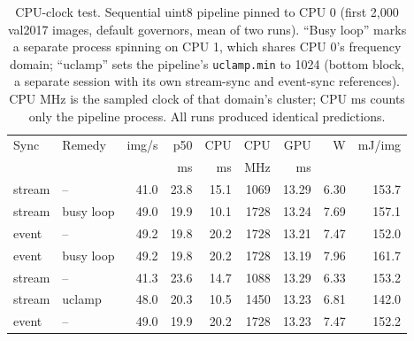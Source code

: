 \begin{table}[t]
\centering
\caption{CPU-clock test. Sequential uint8 pipeline pinned to CPU 0 (first 2,000 val2017
images, default governors, mean of two runs). ``Busy loop'' marks a separate process
spinning on CPU 1, which shares CPU 0's frequency domain; ``uclamp'' sets the pipeline's
\texttt{uclamp.min} to 1024 (bottom block, a separate session with its own stream-sync
and event-sync references). CPU MHz is the sampled clock of that domain's cluster; CPU ms counts only the pipeline
process. All runs produced identical predictions.}
\label{tab:cpufreq}
\footnotesize
\setlength{\tabcolsep}{2.0pt}
\begin{tabular*}{\columnwidth}{@{\extracolsep{\fill}}ll rrrrrrr@{}}
\toprule
Sync & Remedy & img/s & p50 & CPU & CPU & GPU & W & mJ/img \\
 & & & ms & ms & MHz & ms & & \\
\midrule
stream & -- & 41.0 & 23.8 & 15.1 & 1069 & 13.29 & 6.30 & 153.7 \\
stream & busy loop & 49.0 & 19.9 & 10.1 & 1728 & 13.24 & 7.69 & 157.1 \\
event & -- & 49.2 & 19.8 & 20.2 & 1728 & 13.21 & 7.47 & 152.0 \\
event & busy loop & 49.2 & 19.8 & 20.2 & 1728 & 13.19 & 7.96 & 161.7 \\ \midrule
stream & -- & 41.3 & 23.6 & 14.7 & 1088 & 13.29 & 6.33 & 153.2 \\
stream & uclamp & 48.0 & 20.3 & 10.5 & 1450 & 13.23 & 6.81 & 142.0 \\
event & -- & 49.0 & 19.9 & 20.2 & 1728 & 13.23 & 7.47 & 152.2 \\
\bottomrule
\end{tabular*}
\end{table}
